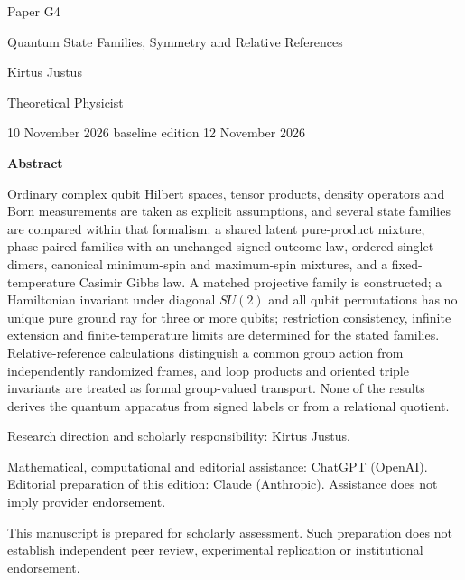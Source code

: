 \documentclass[11pt,a4paper]{article}
\begin{document}
\begin{titlepage}
{\small\sffamily \ProgramTitle\hfill Paper G4\par}
\vspace*{16mm}
{\LARGE\bfseries\raggedright{} Quantum State Families, Symmetry and Relative References\par}
\vspace{11mm}
{\large Kirtus Justus\par}
\vspace{1mm}
Theoretical Physicist\par
\AuthorLocation\par
\vspace{2mm}
10 November 2026 \textperiodcentered{} baseline edition 12 November 2026\par
\vspace{11mm}
\textbf{Abstract}\par
Ordinary complex qubit Hilbert spaces, tensor products, density operators and Born measurements are taken as explicit assumptions, and several state families are compared within that formalism: a shared latent pure-product mixture, phase-paired families with an unchanged signed outcome law, ordered singlet dimers, canonical minimum-spin and maximum-spin mixtures, and a fixed-temperature Casimir Gibbs law. A matched projective family is constructed; a Hamiltonian invariant under diagonal $SU(2)$ and all qubit permutations has no unique pure ground ray for three or more qubits; restriction consistency, infinite extension and finite-temperature limits are determined for the stated families. Relative-reference calculations distinguish a common group action from independently randomized frames, and loop products and oriented triple invariants are treated as formal group-valued transport. None of the results derives the quantum apparatus from signed labels or from a relational quotient.\par
\vfill
{\small Research direction and scholarly responsibility: Kirtus Justus.\par
Mathematical, computational and editorial assistance: ChatGPT (OpenAI). Editorial preparation of this edition: Claude (Anthropic).
Assistance does not imply provider endorsement.\par
This manuscript is prepared for scholarly assessment. Such preparation does not establish independent peer review,
experimental replication or institutional endorsement.\par}
\end{titlepage}
\setcounter{page}{2}
\end{document}
